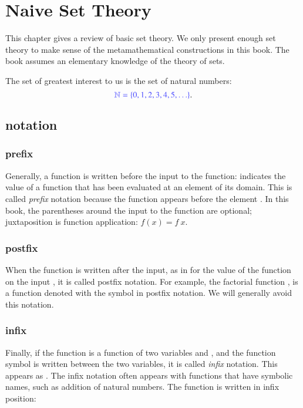 \chapter{Naive Set Theory}

This chapter gives a review of basic set theory.  We only present enough set theory to make sense of the metamathematical constructions in this book.
The book assumes an elementary knowledge of the theory of sets.  

The set of greatest interest to us is the set of natural numbers:
$$
\mc{\ring{N}=\{0,1,2,3,4,5,\ldots\}}.
$$


\section{notation}


\subsection{prefix}

Generally, a function is written before the input to the function:
 indicates the value of a function  that has been evaluated
at an element  of its domain.  This is called {\it prefix} notation
because the function  appears before the element .  
In this book, the parentheses around the input  to the function are optional;
juxtaposition is function application:
$f(x) = f~x$.

\subsection{postfix}

When the function is written after the input, as in  for the value of the function on the input , it is called postfix notation.  For example, the factorial function , is a function denoted with the symbol \mc{$!$} in postfix notation.   We will generally avoid this notation.

\subsection{infix}

Finally, if the function is a function of two variables  and , and the function symbol is written between the two variables, it is called {\it infix} notation.  This appears as .    The infix notation often appears with functions that have symbolic names, such as addition of natural numbers.  The function is written in infix position:


